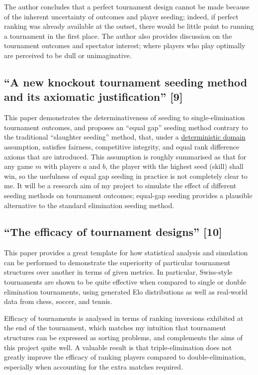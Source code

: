 \documentclass[a4,11pt,twoside,final]{article}
\makeatletter
\newcommand{\cslcitation}[2]
 {\protect\hyper@linkstart{cite}{citeproc_bib_item_#1}#2\hyper@linkend}
\makeatother
\begin{document}
The author concludes that a perfect tournament design cannot be made because of
the inherent uncertainty of outcomes and player seeding; indeed, if perfect
ranking was already available at the outset, there would be little point to
running a tournament in the first place. The author also provides discussion on
the tournament outcomes and spectator interest; where players who play optimally
are perceived to be dull or unimaginative.

\subsection{``A new knockout tournament seeding method and its axiomatic justification'' \cslcitation{9}{[9]}}
\label{sec:orgb77ace2}

This paper demonstrates the determinativeness of seeding to single-elimination
tournament outcomes, and proposes an ``equal gap'' seeding method contrary to the
traditional ``slaughter seeding'' method, that, under a \uline{deterministic domain}
assumption, satisfies fairness, competitive integrity, and equal rank difference
axioms that are introduced. This assumption is roughly summarised as that for
any game \(m\) with players \(a\) and \(b\), the player with the highest seed (skill)
shall win, so the usefulness of equal gap seeding in practice is not completely
clear to me. It will be a research aim of my project to simulate the effect of
different seeding methods on tournament outcomes; equal-gap seeding provides a
plausible alternative to the standard elimination seeding method.

\subsection{``The efficacy of tournament designs'' \cslcitation{10}{[10]}}
\label{sec:orgb386b77}

This paper provides a great template for how statistical analysis and simulation
can be performed to demonstrate the superiority of particular tournament
structures over another in terms of given metrics. In particular, Swiss-style
tournaments are shown to be quite effective when compared to single or double
elimination tournaments, using generated Elo distributions as well as real-world
data from chess, soccer, and tennis.

Efficacy of tournaments is analysed in terms of ranking inversions exhibited at
the end of the tournament, which matches my intuition that tournament structures
can be expressed as sorting problems, and complements the aims of this project
quite well. A valuable result is that triple-elimination does not greatly
improve the efficacy of ranking players compared to double-elimination,
especially when accounting for the extra matches required.
\end{document}
